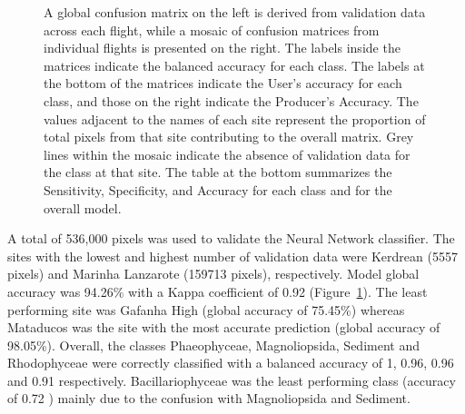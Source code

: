 \documentclass[
  number]{elsarticle}
\begin{document}
\label{cell-fig-Validation}
\begin{figure}[H]


\caption{\label{fig-Validation}A global confusion matrix on the left is
derived from validation data across each flight, while a mosaic of
confusion matrices from individual flights is presented on the right.
The labels inside the matrices indicate the balanced accuracy for each
class. The labels at the bottom of the matrices indicate the User's
accuracy for each class, and those on the right indicate the Producer's
Accuracy. The values adjacent to the names of each site represent the
proportion of total pixels from that site contributing to the overall
matrix. Grey lines within the mosaic indicate the absence of validation
data for the class at that site. The table at the bottom summarizes the
Sensitivity, Specificity, and Accuracy for each class and for the
overall model.}

\end{figure}%

A total of 536,000 pixels was used to validate the Neural Network
classifier. The sites with the lowest and highest number of validation
data were Kerdrean (5557 pixels) and Marinha Lanzarote (159713 pixels),
respectively. Model global accuracy was 94.26\% with a Kappa coefficient
of 0.92 (Figure~\ref{fig-Validation}). The least performing site was
Gafanha High (global accuracy of 75.45\%) whereas Mataducos was the site
with the most accurate prediction (global accuracy of 98.05\%). Overall,
the classes Phaeophyceae, Magnoliopsida, Sediment and Rhodophyceae were
correctly classified with a balanced accuracy of 1, 0.96, 0.96 and 0.91
respectively. Bacillariophyceae was the least performing class (accuracy
of 0.72 ) mainly due to the confusion with Magnoliopsida and Sediment.
\end{document}
